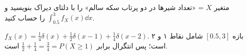 \begin{exercise}
 متغیر $X$ = «تعداد شیرها در دو پرتاب سکه سالم» را با دلتای دیراک بنویسید و $\int_{0.5}^{3}f_X(x)\dd x$ را حساب کنید.
\end{exercise}
\begin{solution}
$f_X(x)=\frac14\delta(x)+\frac12\delta(x-1)+\frac14\delta(x-2)$. بازه $[0.5,3]$ شامل نقاط ۱ و ۲ است؛ پس انتگرال برابر $\frac12+\frac14=\frac34=P(X\ge1)$ است.
\end{solution}
